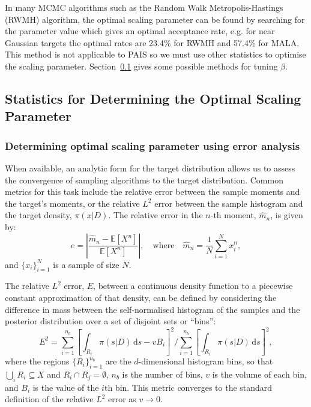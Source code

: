 \documentclass[final]{siamltex}
\begin{document}
In many MCMC algorithms such as the Random Walk Metropolis-Hastings
(RWMH) algorithm, the optimal scaling parameter can be found by
searching for the parameter value which gives an optimal acceptance
rate, e.g. for near Gaussian targets the optimal rates are 23.4\% for
RWMH and 57.4\% for MALA\cite{roberts2001optimal}. This method
is not applicable to PAIS so we must use other statistics to optimise
the scaling parameter. Section~\ref{sec:statistics} gives some
possible methods for tuning $\beta$.





\subsection{Statistics for Determining the Optimal Scaling Parameter}\label{sec:statistics}

\subsubsection{Determining optimal scaling parameter using error analysis}

When available, an analytic form for the target distribution allows us
to assess the convergence of sampling algorithms to the target
distribution. Common metrics for this task include the relative error
between the sample moments and the target's moments, or the
relative $L^2$ error between the sample histogram and the target
density, $\pi(x|D)$. The relative error in the $n$-th moment,
$\hat{m}_n$, is given by:
\begin{equation}\label{eq:34567}
	e = \left|\frac{\hat{m}_n - \mathbb{E}[X^n]}{\mathbb{E}[X^n]}\right|, \quad \text{where} \quad \hat{m}_n = \frac{1}{N}\sum_{i=1}^N \! x_i^n,
\end{equation}
and $\{x_i\}_{i=1}^N$ is a sample of size $N$.

The relative $L^2$ error, $E$, between a continuous density function to a
piecewise constant approximation of that density, can be defined by considering the
difference in mass between the self-normalised histogram of the
samples and the posterior distribution over a set of disjoint sets or
``bins'':
\begin{equation}\label{eqn:L2_error}
	E^2 = \sum\limits_{i=1}^{n_b}\left[\displaystyle\int_{R_i} \! \pi(s|D) \, \mbox{d}s - vB_i\right]^2 \Big/ \sum\limits_{i=1}^{n_b}\left[\displaystyle\int_{R_i} \! \pi(s|D) \, \mbox{d}s\right]^2,
\end{equation}
where the regions $\{R_i\}_{i=1}^{n_b}$ are the $d$-dimensional
histogram bins, so that $\bigcup_i R_i \subseteq X$ and
$R_i\cap R_j=\emptyset$, $n_b$ is the number of bins, $v$ is the
volume of each bin, and $B_i$ is the value of the $i$th bin. This
metric converges to the standard definition of the relative $L^2$
error as $v\rightarrow 0$.
\end{document}
